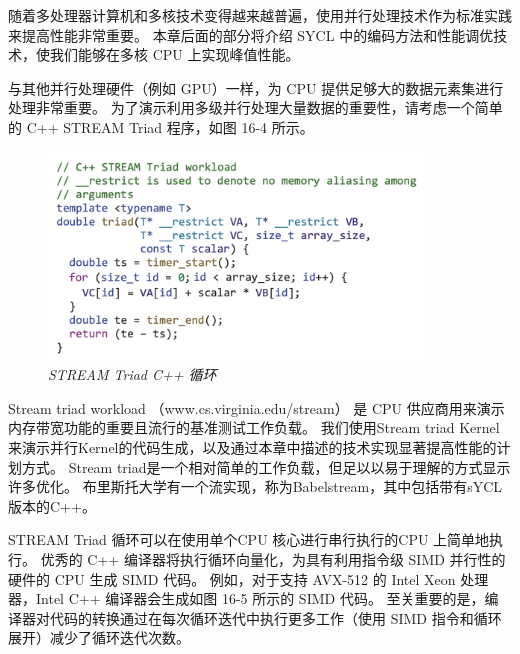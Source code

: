 随着多处理器计算机和多核技术变得越来越普遍，使用并行处理技术作为标准实践来提高性能非常重要。 
本章后面的部分将介绍 SYCL 中的编码方法和性能调优技术，使我们能够在多核 CPU 上实现峰值性能。

与其他并行处理硬件（例如 GPU）一样，为 CPU 提供足够大的数据元素集进行处理非常重要。 
为了演示利用多级并行处理大量数据的重要性，请考虑一个简单的 C++ STREAM Triad 程序，如图 16-4 所示。

\begin{figure}[H]
	\centering
	\includegraphics[width=0.9\textwidth]{figs/F16.4.png}
	\caption{\textit{STREAM Triad C++ 循环 }}
\end{figure}

\begin{remark}
Stream triad workload （www.cs.virginia.edu/stream） 
是 CPU 供应商用来演示内存带宽功能的重要且流行的基准测试工作负载。
我们使用Stream triad Kernel来演示并行Kernel的代码生成，以及通过本章中描述的技术实现显著提高性能的计划方式。
Stream triad是一个相对简单的工作负载，但足以以易于理解的方式显示许多优化。
布里斯托大学有一个流实现，称为Babelstream，其中包括带有sYCL版本的C++。
\end{remark}

STREAM Triad 循环可以在使用单个CPU 核心进行串行执行的CPU 上简单地执行。 
优秀的 C++ 编译器将执行循环向量化，为具有利用指令级 SIMD 并行性的硬件的 CPU 生成 SIMD 代码。 
例如，对于支持 AVX-512 的 Intel Xeon 处理器，Intel C++ 编译器会生成如图 16-5 所示的 SIMD 代码。 
至关重要的是，编译器对代码的转换通过在每次循环迭代中执行更多工作（使用 SIMD 指令和循环展开）减少了循环迭代次数。

